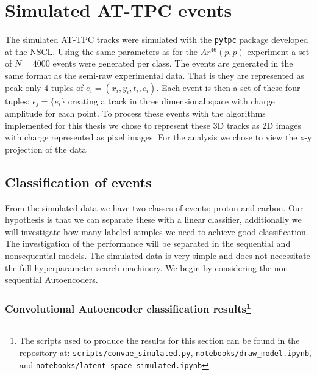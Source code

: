 \section{Simulated AT-TPC events}
The simulated AT-TPC tracks were simulated with the \lstinline{pytpc} package developed at the NSCL. Using the same parameters as for the $Ar^{46}(p, p)$ experiment a set of $N=4000$ events were generated per class. The events are generated in the same format as the semi-raw experimental data. That is they are represented as peak-only 4-tuples of $e_i = (x_i, y_i, t_i, c_i)$. Each event is then a set of these four-tuples: $\epsilon_j = \{e_i\}$ creating a track in three dimensional space with charge amplitude for each point. To process these events with the algorithms implemented for this thesis we chose to represent these 3D tracks as 2D images with charge represented as pixel images. For the analysis we chose to view the x-y projection of the data 

\subsection{Classification of events} 
From the simulated data we have two classes of events; proton and carbon. Our hypothesis is that we can separate these with a linear classifier, additionally we will investigate how many labeled samples we need to achieve good classification. The investigation of the performance will be separated in the sequential and non\-sequential models. The simulated data is very simple and does not necessitate the full hyperparameter search machinery. We begin by considering the non-sequential Autoencoders.

\subsubsection{Convolutional Autoencoder classification results\protect\footnote{The scripts used to produce the results for this section can be found in the repository at: \lstinline{scripts/convae_simulated.py}, \lstinline{notebooks/draw_model.ipynb}, and \lstinline{notebooks/latent_space_simulated.ipynb}}}

